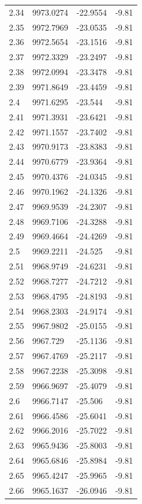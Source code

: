 \begin{table}[H]
\begin{tabular}{llll}
2.34 & 9973.0274 & -22.9554 & -9.81 \\
2.35 & 9972.7969 & -23.0535 & -9.81 \\
2.36 & 9972.5654 & -23.1516 & -9.81 \\
2.37 & 9972.3329 & -23.2497 & -9.81 \\
2.38 & 9972.0994 & -23.3478 & -9.81 \\
2.39 & 9971.8649 & -23.4459 & -9.81 \\
2.4 & 9971.6295 & -23.544 & -9.81 \\
2.41 & 9971.3931 & -23.6421 & -9.81 \\
2.42 & 9971.1557 & -23.7402 & -9.81 \\
2.43 & 9970.9173 & -23.8383 & -9.81 \\
2.44 & 9970.6779 & -23.9364 & -9.81 \\
2.45 & 9970.4376 & -24.0345 & -9.81 \\
2.46 & 9970.1962 & -24.1326 & -9.81 \\
2.47 & 9969.9539 & -24.2307 & -9.81 \\
2.48 & 9969.7106 & -24.3288 & -9.81 \\
2.49 & 9969.4664 & -24.4269 & -9.81 \\
2.5 & 9969.2211 & -24.525 & -9.81 \\
2.51 & 9968.9749 & -24.6231 & -9.81 \\
2.52 & 9968.7277 & -24.7212 & -9.81 \\
2.53 & 9968.4795 & -24.8193 & -9.81 \\
2.54 & 9968.2303 & -24.9174 & -9.81 \\
2.55 & 9967.9802 & -25.0155 & -9.81 \\
2.56 & 9967.729 & -25.1136 & -9.81 \\
2.57 & 9967.4769 & -25.2117 & -9.81 \\
2.58 & 9967.2238 & -25.3098 & -9.81 \\
2.59 & 9966.9697 & -25.4079 & -9.81 \\
2.6 & 9966.7147 & -25.506 & -9.81 \\
2.61 & 9966.4586 & -25.6041 & -9.81 \\
2.62 & 9966.2016 & -25.7022 & -9.81 \\
2.63 & 9965.9436 & -25.8003 & -9.81 \\
2.64 & 9965.6846 & -25.8984 & -9.81 \\
2.65 & 9965.4247 & -25.9965 & -9.81 \\
2.66 & 9965.1637 & -26.0946 & -9.81 \\

\end{tabular}
\end{table}
